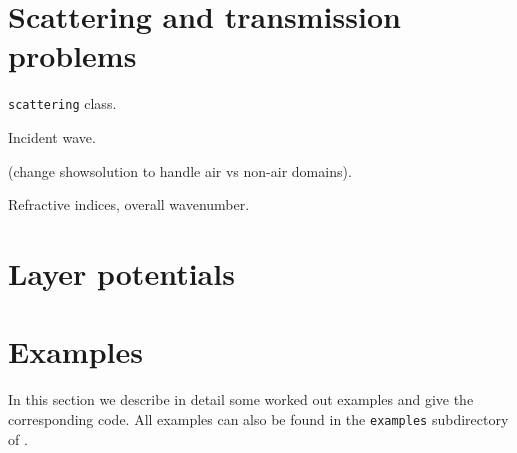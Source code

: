 \documentclass[11pt]{article}
\begin{document}
\section{Scattering and transmission problems}

{\tt scattering} class.

Incident wave.

(change showsolution to handle air vs non-air domains).

Refractive indices, overall wavenumber.

\section{Layer potentials}

\section{Examples}

In this section we describe in detail some worked out examples and
give the corresponding code. All examples can also be found in the
{\texttt{examples}} subdirectory of \mpspack.


 

\end{document}
